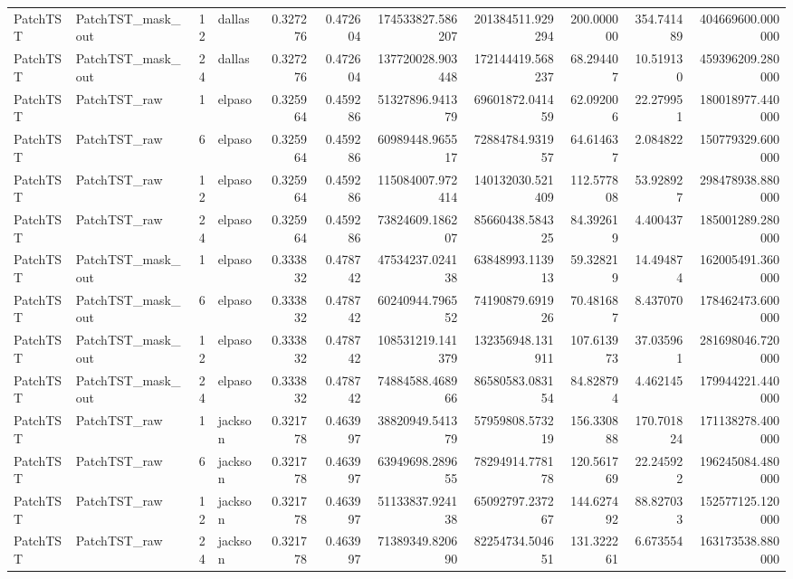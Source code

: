 \begin{longtable}{llrlrrrrrrr}
PatchTST & PatchTST\_mask\_out & 12 & dallas & 0.327276 & 0.472604 & 174533827.586207 & 201384511.929294 & 200.000000 & 354.741489 & 404669600.000000 \\
PatchTST & PatchTST\_mask\_out & 24 & dallas & 0.327276 & 0.472604 & 137720028.903448 & 172144419.568237 & 68.294407 & 10.519130 & 459396209.280000 \\
PatchTST & PatchTST\_raw & 1 & elpaso & 0.325964 & 0.459286 & 51327896.941379 & 69601872.041459 & 62.092006 & 22.279951 & 180018977.440000 \\
PatchTST & PatchTST\_raw & 6 & elpaso & 0.325964 & 0.459286 & 60989448.965517 & 72884784.931957 & 64.614637 & 2.084822 & 150779329.600000 \\
PatchTST & PatchTST\_raw & 12 & elpaso & 0.325964 & 0.459286 & 115084007.972414 & 140132030.521409 & 112.577808 & 53.928927 & 298478938.880000 \\
PatchTST & PatchTST\_raw & 24 & elpaso & 0.325964 & 0.459286 & 73824609.186207 & 85660438.584325 & 84.392619 & 4.400437 & 185001289.280000 \\
PatchTST & PatchTST\_mask\_out & 1 & elpaso & 0.333832 & 0.478742 & 47534237.024138 & 63848993.113913 & 59.328219 & 14.494874 & 162005491.360000 \\
PatchTST & PatchTST\_mask\_out & 6 & elpaso & 0.333832 & 0.478742 & 60240944.796552 & 74190879.691926 & 70.481687 & 8.437070 & 178462473.600000 \\
PatchTST & PatchTST\_mask\_out & 12 & elpaso & 0.333832 & 0.478742 & 108531219.141379 & 132356948.131911 & 107.613973 & 37.035961 & 281698046.720000 \\
PatchTST & PatchTST\_mask\_out & 24 & elpaso & 0.333832 & 0.478742 & 74884588.468966 & 86580583.083154 & 84.828794 & 4.462145 & 179944221.440000 \\
PatchTST & PatchTST\_raw & 1 & jackson & 0.321778 & 0.463997 & 38820949.541379 & 57959808.573219 & 156.330888 & 170.701824 & 171138278.400000 \\
PatchTST & PatchTST\_raw & 6 & jackson & 0.321778 & 0.463997 & 63949698.289655 & 78294914.778178 & 120.561769 & 22.245922 & 196245084.480000 \\
PatchTST & PatchTST\_raw & 12 & jackson & 0.321778 & 0.463997 & 51133837.924138 & 65092797.237267 & 144.627492 & 88.827033 & 152577125.120000 \\
PatchTST & PatchTST\_raw & 24 & jackson & 0.321778 & 0.463997 & 71389349.820690 & 82254734.504651 & 131.322261 & 6.673554 & 163173538.880000 \\

\end{longtable}

